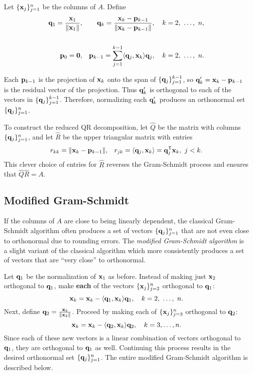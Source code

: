 Let $\{\mathbf{x}_j\}_{j=1}^n$ be the columns of $A$.
Define
%
\begin{align*}
\q_1 = \frac{\x_1}{\|\x_1\|},
&&
\q_{k} = \frac{\x_k - \p_{k-1}}{\|\x_k - \p_{k-1}\|},\quad k=2,\ \ldots,\ n,
\\ \\
\p_0 = \0,
&&
\p_{k-1} = \sum_{j=1}^{k-1} \langle \q_j, \x_k\rangle \q_j,\quad k=2,\ \ldots,\ n.
\end{align*}

Each $\mathbf{p}_{k-1}$ is the projection of $\mathbf{x}_k$ onto the span of $\{\mathbf{q}_j\}_{j=1}^{k-1}$, so $\mathbf{q}_k' = \mathbf{x}_k - \mathbf{p}_{k-1}$ is the residual vector of the projection.
Thus $\mathbf{q}_k'$ is orthogonal to each of the vectors in $\{\mathbf{q}_j\}_{j=1}^{k-1}$.
Therefore, normalizing each $\mathbf{q}_k'$ produces an orthonormal set $\{\mathbf{q}_j\}_{j=1}^n$.

To construct the reduced QR decomposition, let $\widehat{Q}$ be the matrix with columns $\{\mathbf{q}_j\}_{j=1}^n$, and let $\widehat{R}$ be the upper triangular matrix with entries
%
\begin{align*}
r_{kk} = \|\mathbf{x}_k-\mathbf{p}_{k-1}\|,
&&
r_{jk} = \langle \mathbf{q}_j, \mathbf{x}_k\rangle = \mathbf{q}_j^{\mathsf T}\mathbf{x}_k,\ j < k.
\end{align*}
%
This clever choice of entries for $\widehat{R}$ reverses the Gram-Schmidt process and ensures that $\widehat{Q}\widehat{R} = A$.

\begin{comment}
To construct the full QR decomposition, choose $m - n$ vectors $\{\x_j\}_{j=n+1}^m$ such that the entire set of original vectors $\{\x_j\}_{j=1}^m$ is linearly independent, then continue the Gram-Schmidt process to produce the additional columns of $Q$.
Appending $m - n$ rows of zeros to $\widehat{R}$ results in $R$.
\end{comment}

\subsection*{Modified Gram-Schmidt} %

If the columns of $A$ are close to being linearly dependent, the classical Gram-Schmidt algorithm often produces a set of vectors $\{\mathbf{q}_j\}_{j=1}^n$ that are not even close to orthonormal due to rounding errors.
The \emph{modified Gram-Schmidt algorithm} is a slight variant of the classical algorithm which more consistently produces a set of vectors that are ``very close'' to orthonormal.

Let $\mathbf{q}_1$ be the normalization of $\mathbf{x}_1$ as before.
Instead of making just $\mathbf{x}_2$ orthogonal to $\mathbf{q}_1$, make \textbf{each} of the vectors $\{\mathbf{x}_j\}_{j=2}^n$ orthogonal to $\mathbf{q}_1$:
\[\mathbf{x}_k = \mathbf{x}_k - \langle \mathbf{q}_1,\mathbf{x}_{k} \rangle \mathbf{q}_1,\quad k=2,\ \ldots,\ n.\]
Next, define $\mathbf{q}_2 = \frac{\mathbf{x}_2}{\|\mathbf{x}_2\|}$.
Proceed by making each of $\{\mathbf{x}_j\}_{j=3}^n$ orthogonal to $\mathbf{q}_2$:
\[\mathbf{x}_k = \mathbf{x}_k - \langle \mathbf{q}_2,\mathbf{x}_{k} \rangle \mathbf{q}_2,\quad k=3,\ldots,n.\]
Since each of these new vectors is a linear combination of vectors orthogonal to $\mathbf{q}_1$, they are orthogonal to $\mathbf{q}_1$ as well.
Continuing this process results in the desired orthonormal set $\{\mathbf{q}_j\}_{j=1}^n$.
The entire modified Gram-Schmidt algorithm is described below. %

